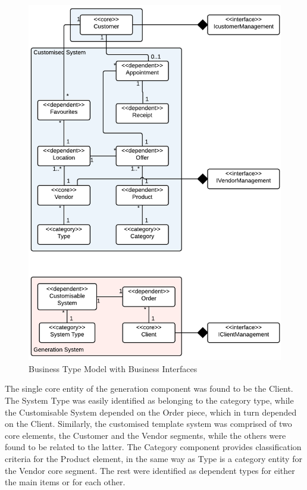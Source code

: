 \begin{figure}[!ht]
\centering
\includegraphics[scale=0.3]{img/Business_Type_Model.png}
\caption{Business Type Model with Business Interfaces}
\label{fig:business_type_model}
\end{figure}

The single core entity of the generation component was found to be the Client. The System Type was easily identified as belonging to the category type, while the Customisable System depended on the Order piece, which in turn depended on the Client. Similarly, the customised template system was comprised of two core elements, the Customer and the Vendor segments, while the others were found to be related to the latter. The Category component provides classification criteria for the Product element, in the same way as Type is a category entity for the Vendor core segment. The rest were identified as dependent types for either the main items or for each other.\\

